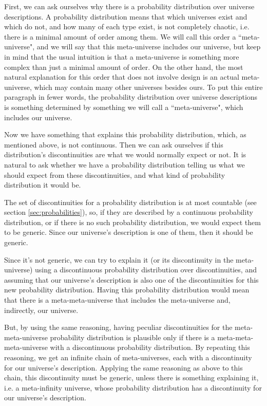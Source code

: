 \documentclass[a4paper
,draft
]{article}
\newcommand{\ghilimele}[1]{``#1"}
\begin{document}
First, we can ask ourselves why there is a probability distribution over
universe descriptions.
A probability distribution means that which universes exist and which do not,
and how many of each type exist, is not completely chaotic,
i.e. there is a minimal amount of order among them.
We will call this order a \ghilimele{meta-universe}, and we will say that
this meta-universe includes our universe, but keep in mind that the usual
intuition is that a meta-universe is something more complex than just
a minimal amount of order.
On the other hand, the most natural explanation for this order
that does not involve design is an actual
meta-universe, which may contain many other universes besides ours.
To put this entire paragraph in fewer words, the probability distribution over
universe descriptions is something determined by something we will call
a \ghilimele{meta-universe}, which includes our universe.

Now we have something that explains this probability distribution, which,
as mentioned above, is not continuous.
Then we can ask ourselves if this distribution's discontinuities are what
we would normally expect or not.
It is natural to ask whether we have a probability distribution telling us
what we should expect from these discontinuities, and what kind of probability
distribution it would be.

The set of discontinuities for a probability distribution is at most countable
(see section \ref{sec:probabilities}), so, if they are described by a
continuous probability
distribution, or if there is no such probability distribution, we would
expect them to be generic.
Since our universe's description is one of them, then it should be generic.

Since it's not generic, we can try to explain it (or its discontinuity
in the meta-universe)
using a discontinuous probability distribution over discontinuities,
and assuming that our universe's description is also one of the
discontinuities for this new probability distribution.
Having this probability distribution would mean that there is
a meta-meta-universe that includes the meta-universe and, indirectly,
our universe.

But, by using the same reasoning, having peculiar discontinuities for the
meta-meta-universe probability
distribution is plausible only if there is a meta-meta-meta-universe
with a discontinuous probability distribution.
By repeating this reasoning, we get an infinite chain of meta-universes,
each with a discontinuity for our universe's
description.
Applying the same reasoning as above to this chain, this discontinuity
must be generic,
unless there is something explaining it, i.e. a meta-infinity universe,
whose probability distribution has a discontinuity for our universe's
description.
\end{document}
